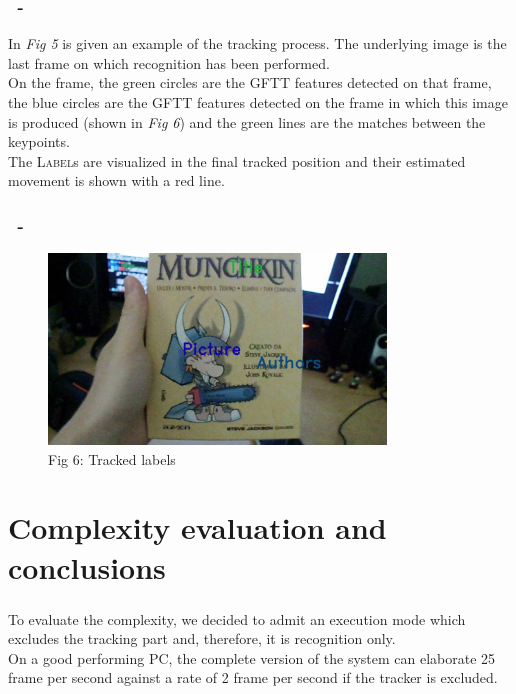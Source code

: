 \documentclass{beamer}
\begin{document}
  \begin{frame}
    \frametitle{\insertsection\ - \insertsubsection}
	In \emph{Fig 5} is given an example of the tracking process. The underlying
	image is the last frame on which recognition has been performed.\\
	On the frame, the green circles are the GFTT features detected on that frame,
	the blue circles are the GFTT features detected on the frame in which this
	image is produced (shown in \emph{Fig 6}) and the green lines are the matches
	between the keypoints.\\
	The \textsc{Label}s are visualized in the final tracked position and their
	estimated movement is shown with a red line.
  \end{frame}

  \begin{frame}
    \frametitle{\insertsection\ - \insertsubsection}
	\begin{figure}
		\centering
		\includegraphics[width=0.8\textwidth]{images/sampleFrame.jpg}\\
		Fig 6: Tracked labels
	\end{figure}
  \end{frame}
  
  \section{Complexity evaluation and conclusions}

  \begin{frame}
    \frametitle{\insertsection}
	To evaluate the complexity, we decided to admit an execution mode which
	excludes the tracking part and, therefore, it is recognition only.\\
	On a good performing PC, the complete version of the system can elaborate
	25 frame per second against a rate of 2 frame per second if the tracker
	is excluded.
  \end{frame}
\end{document}
